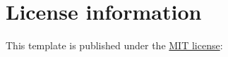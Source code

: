 

\section{License information}

This template is published under the \href{https://opensource.org/licenses/mit-license.php}{MIT license}:

